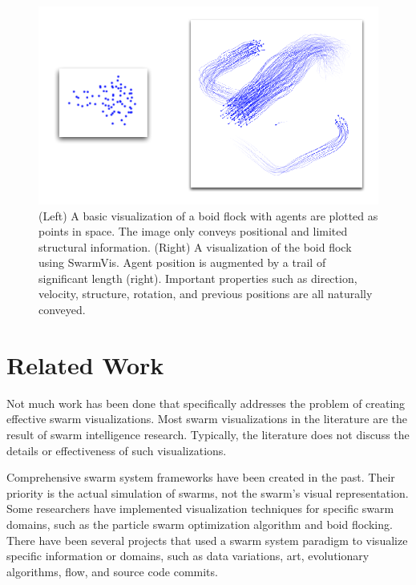 \documentclass{vgtc}
\begin{document}
\begin{figure}[ht]
\centering
\includegraphics[scale=.55]{images/intro.pdf}
\caption{(Left) A basic visualization of a boid flock with agents are plotted as
points in space. The image only conveys positional and limited structural information.
(Right) A visualization of the boid flock using SwarmVis. Agent
position is augmented by a trail of significant length (right).
Important properties such as direction, velocity, structure, rotation,
and previous positions are all naturally conveyed.
}
\label{Intro}
\end{figure}


\section{Related Work}
Not much work has been done that specifically addresses the problem of creating effective swarm visualizations.
Most swarm visualizations in the literature are the result of swarm intelligence research.
Typically, the literature does not discuss the details or effectiveness of such visualizations. 

Comprehensive  swarm system frameworks\cite{Luke}\cite{860347} have been created in the past.
Their priority is the actual simulation of swarms, not the swarm's visual representation.
Some researchers have implemented visualization techniques for specific swarm domains,
such as the particle swarm optimization algorithm\cite{Secrest} and boid flocking\cite{reynolds1987}.
There have been several projects that used a swarm system paradigm to visualize specific information or domains, such as data variations\cite{1382896}, art\cite{Boyd}, evolutionary algorithms\cite{spector2005ecb}\cite{Spector02evolutionarydynamics},
flow\cite{10.1109/TVCG.2005.87}\cite{Merzkirch}, and source code commits\cite{codeswarm:website}.
\end{document}
